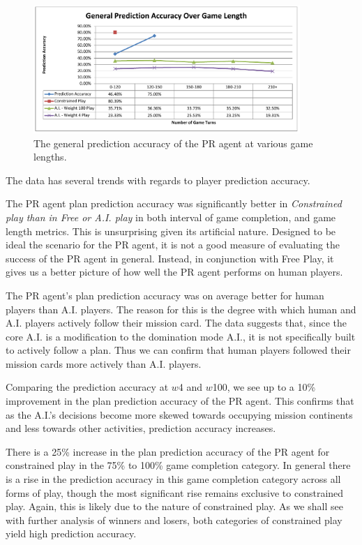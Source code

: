 \documentclass[parskip]{cs4rep}
\begin{document}
\begin{figure}[h]
\centerline{
\includegraphics[width=0.9\textwidth]{images/general-game-length.pdf}
}
\caption{The general prediction accuracy of the PR agent at various game lengths. }
\label{fig:dom-debug-gui}
\end{figure}

The data has several trends with regards to player prediction accuracy. 

The PR agent plan prediction accuracy was significantly better in \textit{Constrained play than in Free or A.I. play} in both interval of game completion, and game length metrics. This is unsurprising given its artificial nature. Designed to be ideal the scenario for the PR agent, it is not a good measure of evaluating the success of the PR agent in general. Instead, in conjunction with Free Play, it gives us a better picture of how well the PR agent performs on human players.

The PR agent's plan prediction accuracy was on average better for human players than A.I. players. The reason for this is the degree with which human and A.I. players actively follow their mission card. The data suggests that, since the core A.I. is a modification to the domination mode A.I., it is not specifically built to actively follow a plan. Thus we can confirm that human players followed their mission cards more actively than A.I. players.

Comparing the prediction accuracy at $w$4 and $w$100, we see up to a 10\% improvement in the plan prediction accuracy of the PR agent. This confirms that as the A.I.'s decisions become more skewed towards occupying mission continents and less towards other activities, prediction accuracy increases. 

There is a 25\% increase in the plan prediction accuracy of the PR agent for constrained play in the 75\% to 100\% game completion category. In general there is a rise in the prediction accuracy in this game completion category across all forms of play, though the most significant rise remains exclusive to constrained play. Again, this is likely due to the nature of constrained play. As we shall see with further analysis of winners and losers, both categories of constrained play yield high prediction accuracy.
\end{document}
